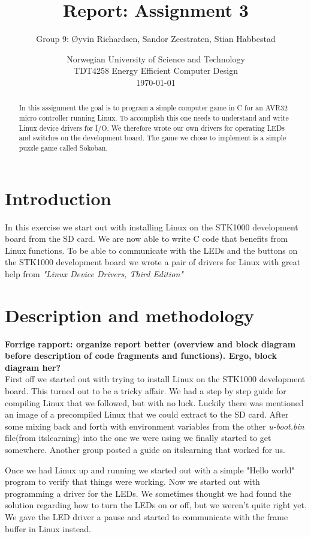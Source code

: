\documentclass[a4paper,11pt]{article}
\title{\textbf{Report: Assignment 3}}
\author{Group 9: \O yvin Richardsen, Sandor Zeestraten, Stian Habbestad}
\date{{Norwegian University of Science and Technology \\
TDT4258 Energy Efficient Computer Design \\}
\today}
\begin{document}
\maketitle

\begin{abstract}
In this assignment the goal is to program a simple computer game in C for an AVR32 micro controller running Linux. To accomplish this one needs to understand and write Linux device drivers for I/O. We therefore wrote our own drivers for operating LEDs and switches on the development board. The game we chose to implement is a simple puzzle game called Sokoban.
\end{abstract}

\bigskip
\tableofcontents
\newpage

\section{Introduction}
In this exercise we start out with installing Linux on the STK1000 development board from the SD card. We are now able to write C code that benefits from Linux functions. %
To be able to communicate with the LEDs and the buttons on the STK1000 development board we wrote a pair of drivers for Linux with great help from \textit{"Linux Device Drivers, Third Edition"} \cite{ldd}


\section{Description and methodology}
\textbf{Forrige rapport: organize report better (overview and block diagram before description of code fragments and functions). Ergo, block diagram her?}\\

First off we started out with trying to install Linux on the STK1000 development board. This turned out to be a tricky affair. We had a step by step guide for compiling Linux that we followed, but with no luck. Luckily there was mentioned an image of a precompiled Linux that we could extract to the SD card. After some mixing back and forth with environment variables from the other \textit{u-boot.bin} file(from itslearning) into the one we were using we finally started to get somewhere. Another group posted a guide on itslearning that worked for us.

Once we had Linux up and running we started out with a simple "Hello world" program to verify that things were working. Now we started out with programming a driver for the LEDs. We sometimes thought we had found the solution regarding how to turn the LEDs on or off, but we weren't quite right yet. We gave the LED driver a pause and started to communicate with the frame buffer in Linux instead. 
\end{document}
